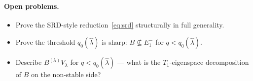 \documentclass[11pt]{article}
\theoremstyle{definition}
\begin{document}
\paragraph{Open problems.}
\begin{itemize}[leftmargin=2em,topsep=0.2em,itemsep=0.1em]
\item Prove the SRD-style reduction~\eqref{eq:srd} structurally in
full generality.
\item Prove the threshold $q_0(\hat\lambda)$ is sharp: $B \not\subseteq E_1^-$
for $q < q_0(\hat\lambda)$.
\item Describe $B^{(\lambda)} V_\lambda$ for $q < q_0(\hat\lambda)$ ---
what is the $T_1$-eigenspace decomposition of $B$ on the
non-stable side?
\end{itemize}
\end{document}
